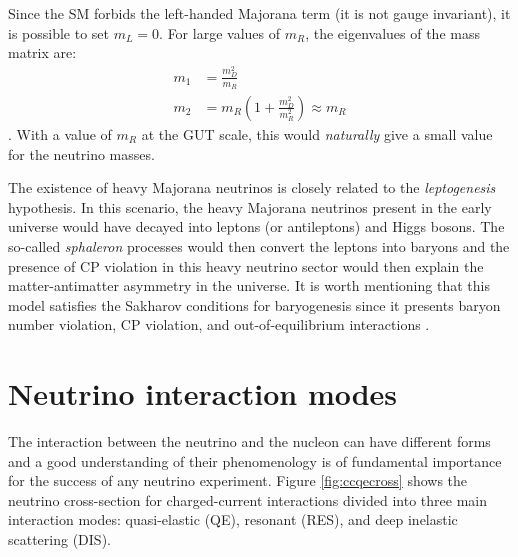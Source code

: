 Since the SM forbids the left-handed Majorana term (it is not gauge invariant), it is possible to set $m_L=0$. For large values of $m_R$, the eigenvalues of the mass matrix are:
\begin{align}
    m_1 & = \frac{m_D^2}{m_R} \\
    m_2 & = m_R \left(1+\frac{m_D^2}{m_R^2}\right) \approx m_R
\end{align}. With a value of $m_R$ at the GUT scale, this would \emph{naturally} give a small value for the neutrino masses. 

The existence of heavy Majorana neutrinos is closely related to the \emph{leptogenesis} hypothesis. In this scenario, the heavy Majorana neutrinos present in the early universe would have decayed into leptons (or antileptons) and Higgs bosons. The so-called \emph{sphaleron} processes would then convert the leptons into baryons and the presence of CP violation in this heavy neutrino sector would then explain the matter-antimatter asymmetry in the universe. It is worth mentioning that this model satisfies the Sakharov conditions \cite{Sakharov:1967dj} for baryogenesis since it presents baryon number violation, CP violation, and out-of-equilibrium interactions \cite{DiBari:2012fz}.


\section{Neutrino interaction modes}\label{sec:modes}
The interaction between the neutrino and the nucleon can have different forms and a good understanding of their phenomenology is of fundamental importance for the success of any neutrino experiment.
Figure \ref{fig:ccqecross} shows the neutrino cross-section for charged-current interactions divided into three main interaction modes: quasi-elastic (QE), resonant (RES), and deep inelastic scattering (DIS). 

